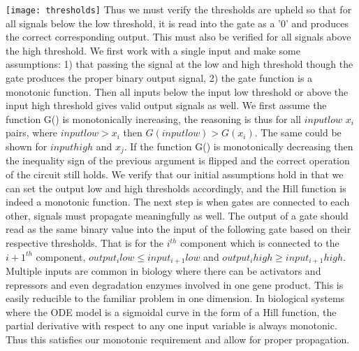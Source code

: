 \documentclass{article}
\begin{document}
\newline
\texttt{[image: thresholds]}
\newline
Thus we must verify the thresholds are upheld so that for all signals below the low threshold, it is read into the gate as a '0' and produces the correct corresponding output.  This must also be verified for all signals above the high threshold. We first work with a single input and make some assumptions:  1) that passing the signal at the low and high threshold though the gate produces the proper binary output signal, 2) the gate function is a monotonic function.  Then all inputs below the input low threshold or above the input high threshold gives valid output signals as well.  We first assume the function G() is monotonically increasing, the reasoning is thus for all $input low$ $x_i$ pairs, where $input low>x_i$ then $G(input low)>G(x_i)$.  The same could be shown for $input high$ and $x_j$.  If the function G() is monotonically decreasing then the inequality sign of the previous argument is flipped and the correct operation of the circuit still holds.  We verify that our initial assumptions hold in that we can set the output low and high thresholds accordingly, and the Hill function is indeed a monotonic function. 
\newline \newline
The next step is when gates are connected to each other, signals must propagate meaningfully as well.  The output of a gate should read as the same binary value into the input of the following gate based on their respective thresholds.  That is for the $i^{th}$ component which is connected to the $i+1^{th}$ component, $output_i low \leq input_{i+1} low$ and $output_i high \geq input_{i+1} high$.  Multiple inputs are common in biology where there can be activators and repressors and even degradation enzymes involved in one gene product.  This is easily reducible to the familiar problem in one dimension.  In biological systems where the ODE model is a sigmoidal curve in the form of a Hill function, the partial derivative with respect to any one input variable is always monotonic.  Thus this satisfies our monotonic requirement and allow for proper propagation. %
\newline \newline
\end{document}
